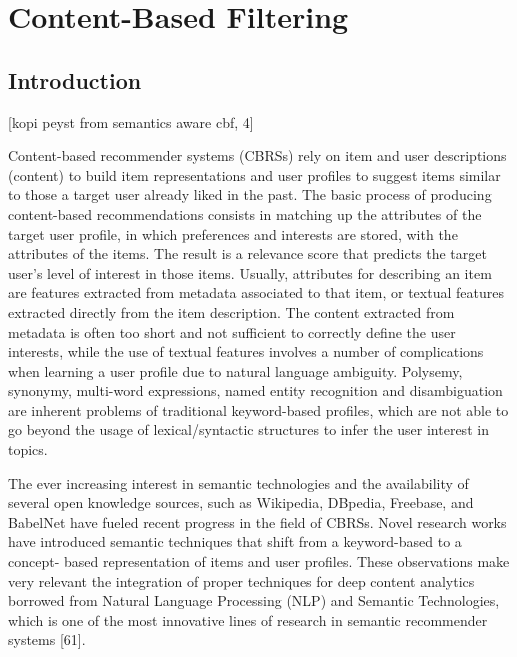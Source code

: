 
\chapter{Content-Based Filtering}\label{chapter:content_based_filtering}

\section{Introduction}

[kopi peyst from semantics aware cbf, 4]

Content-based recommender systems (CBRSs) rely on item and user descriptions (content) to build item representations and user profiles to suggest items similar to those a target user already liked in the past. The basic process of producing content-based recommendations consists in matching up the attributes of the target user profile, in which preferences and interests are stored, with the attributes of the items. The result is a relevance score that predicts the target user’s level of interest in those items. Usually, attributes for describing an item are features extracted from metadata associated to that item, or textual features extracted directly from the item description. The content extracted from metadata is often too short and not sufficient to correctly define the user interests, while the use of textual features involves a number of complications when learning a user profile due to natural language ambiguity. Polysemy, synonymy, multi-word expressions, named entity recognition and disambiguation are inherent problems of traditional keyword-based profiles, which are not able to go beyond the usage of lexical/syntactic structures to infer the user interest in topics.

The ever increasing interest in semantic technologies and the availability of several open knowledge sources, such as Wikipedia, DBpedia, Freebase, and BabelNet have fueled recent progress in the field of CBRSs. Novel research works have introduced semantic techniques that shift from a keyword-based to a concept- based representation of items and user profiles. These observations make very relevant the integration of proper techniques for deep content analytics borrowed from Natural Language Processing (NLP) and Semantic Technologies, which is one of the most innovative lines of research in semantic recommender systems [61].

